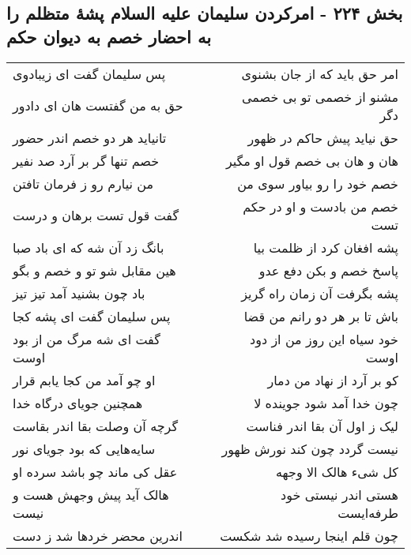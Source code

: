 \begin{center}
\section*{بخش ۲۲۴ - امرکردن سلیمان علیه السلام پشهٔ متظلم را به احضار خصم به دیوان حکم}
\label{sec:sh224}
\begin{longtable}{l p{0.5cm} r}
پس سلیمان گفت ای زیبادوی
&&
امر حق باید که از جان بشنوی
\\
حق به من گفتست هان ای دادور
&&
مشنو از خصمی تو بی خصمی دگر
\\
تانیاید هر دو خصم اندر حضور
&&
حق نیاید پیش حاکم در ظهور
\\
خصم تنها گر بر آرد صد نفیر
&&
هان و هان بی خصم قول او مگیر
\\
من نیارم رو ز فرمان تافتن
&&
خصم خود را رو بیاور سوی من
\\
گفت قول تست برهان و درست
&&
خصم من بادست و او در حکم تست
\\
بانگ زد آن شه که ای باد صبا
&&
پشه افغان کرد از ظلمت بیا
\\
هین مقابل شو تو و خصم و بگو
&&
پاسخ خصم و بکن دفع عدو
\\
باد چون بشنید آمد تیز تیز
&&
پشه بگرفت آن زمان راه گریز
\\
پس سلیمان گفت ای پشه کجا
&&
باش تا بر هر دو رانم من قضا
\\
گفت ای شه مرگ من از بود اوست
&&
خود سیاه این روز من از دود اوست
\\
او چو آمد من کجا یابم قرار
&&
کو بر آرد از نهاد من دمار
\\
همچنین جویای درگاه خدا
&&
چون خدا آمد شود جوینده لا
\\
گرچه آن وصلت بقا اندر بقاست
&&
لیک ز اول آن بقا اندر فناست
\\
سایه‌هایی که بود جویای نور
&&
نیست گردد چون کند نورش ظهور
\\
عقل کی ماند چو باشد سرده او
&&
کل شیء هالک الا وجهه
\\
هالک آید پیش وجهش هست و نیست
&&
هستی اندر نیستی خود طرفه‌ایست
\\
اندرین محضر خردها شد ز دست
&&
چون قلم اینجا رسیده شد شکست
\\
\end{longtable}
\end{center}
